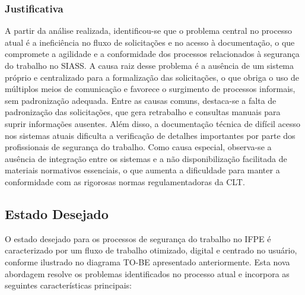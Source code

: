 \documentclass[12pt,a4paper]{article}
\begin{document}
\subsubsection{Justificativa}

A partir da análise realizada, identificou-se que o problema central no processo atual é a ineficiência no fluxo de solicitações e no acesso à documentação, o que compromete a agilidade e a conformidade dos processos relacionados à segurança do trabalho no SIASS. A causa raiz desse problema é a ausência de um sistema próprio e centralizado para a formalização das solicitações, o que obriga o uso de múltiplos meios de comunicação e favorece o surgimento de processos informais, sem padronização adequada. Entre as causas comuns, destaca-se a falta de padronização das solicitações, que gera retrabalho e consultas manuais para suprir informações ausentes. Além disso, a documentação técnica de difícil acesso nos sistemas atuais dificulta a verificação de detalhes importantes por parte dos profissionais de segurança do trabalho. Como causa especial, observa-se a ausência de integração entre os sistemas e a não disponibilização facilitada de materiais normativos essenciais, o que aumenta a dificuldade para manter a conformidade com as rigorosas normas regulamentadoras da CLT.

\clearpage
\subsection{Estado Desejado}

O estado desejado para os processos de segurança do trabalho no IFPE é caracterizado por um fluxo de trabalho otimizado, digital e centrado no usuário, conforme ilustrado no diagrama TO-BE apresentado anteriormente. Esta nova abordagem resolve os problemas identificados no processo atual e incorpora as seguintes características principais:
\end{document}
